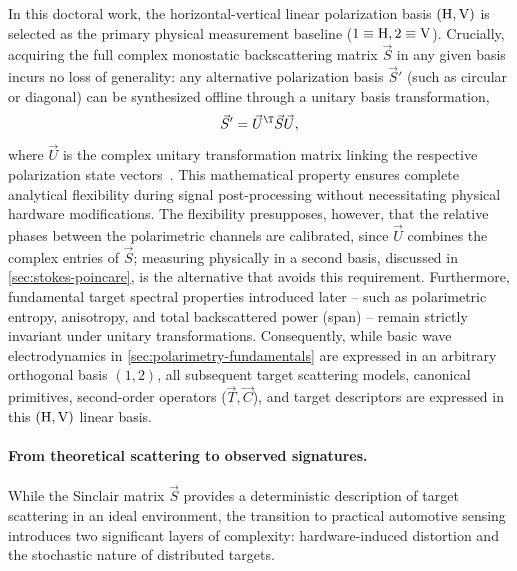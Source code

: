 In this doctoral work, the horizontal-vertical linear polarization basis $(\mathrm{H}, \mathrm{V})$ is selected as the primary physical measurement baseline ($1 \equiv \mathrm{H}, 2 \equiv \mathrm{V}$).
Crucially, acquiring the full complex monostatic backscattering matrix $\vec S$ in any given basis incurs no loss of generality: any alternative polarization basis $\vec S'$ (such as circular or diagonal) can be synthesized offline through a unitary basis transformation,
\begin{equation}
    \label{eq:basis-transformation}
    \vec S' = \vec U^\T \vec S \vec U,
\end{equation}
where $\vec U$ is the complex unitary transformation matrix linking the respective polarization state vectors~\parencite{leePolarimetricRadarImaging2017}.
This mathematical property ensures complete analytical flexibility during signal post-processing without necessitating physical hardware modifications.
The flexibility presupposes, however, that the relative phases between the polarimetric channels are calibrated, since $\vec U$ combines the complex entries of $\vec S$; measuring physically in a second basis, discussed in \cref{sec:stokes-poincare}, is the alternative that avoids this requirement.
Furthermore, fundamental target spectral properties introduced later -- such as polarimetric entropy, anisotropy, and total backscattered power (span) -- remain strictly invariant under unitary transformations.
Consequently, while basic wave electrodynamics in \cref{sec:polarimetry-fundamentals} are expressed in an arbitrary orthogonal basis $(1, 2)$, all subsequent target scattering models, canonical primitives, second-order operators ($\vec T, \vec C$), and target descriptors are expressed in this $(\mathrm{H}, \mathrm{V})$ linear basis.

\paragraph{From theoretical scattering to observed signatures.}
While the Sinclair matrix $\vec S$ provides a deterministic description of target scattering in an ideal environment, the transition to practical automotive sensing introduces two significant layers of complexity: hardware-induced distortion and the stochastic nature of distributed targets.

